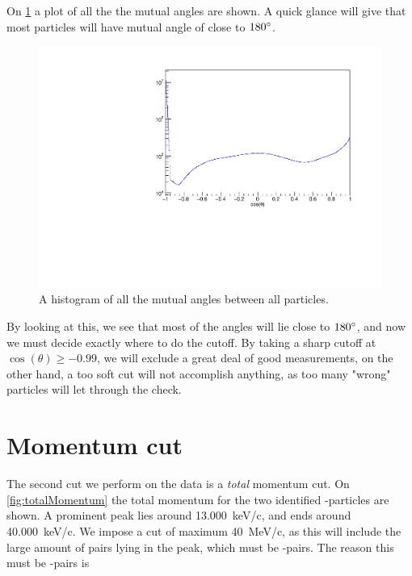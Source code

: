 On \cref{fig:cosAll} a plot of all the the mutual angles are shown. A quick glance will give that most particles will have mutual angle of close to $180\degree$. 

\begin{figure}[h]
	\centering
	\includegraphics[width=\linewidth]{../figures/cosang.pdf}
	\caption{A histogram of all the mutual angles between all particles.}
	\label{fig:cosAll}
\end{figure}

By looking at this, we see that most of the angles will lie close to $180\degree$, and now we must decide exactly where to do the cutoff. 
By taking a sharp cutoff at $\cos(\theta) \geq -0.99$, we will exclude a great deal of good measurements, on the other hand, a too soft cut will not accomplish anything, as too many "wrong" particles will let through the check. 



\section{Momentum cut}
The second cut we perform on the data is a \textit{total} momentum cut. On \cref{fig:totalMomentum} the total momentum for the two identified \al-particles are shown. 
A prominent peak lies around \SI{13.000}{keV/c}, and ends around \SI{40.000 }{keV/c}. 
We impose a cut of maximum \SI{40}{MeV/c}, as this will include the large amount of pairs lying in the peak, which must be \al-\al pairs. The reason this must be \al-\al pairs is 

